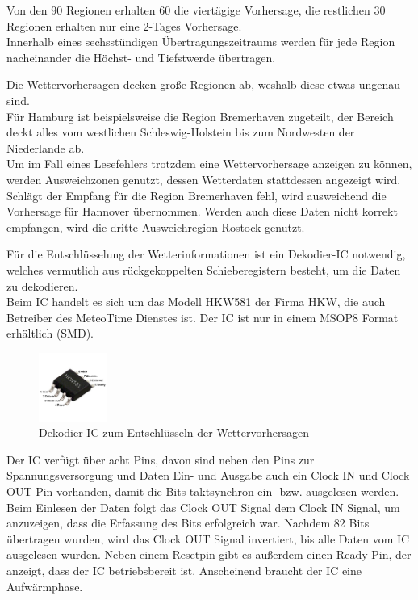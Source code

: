 \documentclass[a4paper,11pt]{article}
\begin{document}
\vspace{0.2cm}
\noindent
Von den 90 Regionen erhalten 60 die viertägige Vorhersage, die restlichen 30 Regionen erhalten nur eine 2-Tages Vorhersage. \\
Innerhalb eines sechsstündigen Übertragungszeitraums werden für jede Region nacheinander die Höchst- und Tiefstwerde übertragen.

\noindent
Die Wettervorhersagen decken große Regionen ab, weshalb diese etwas ungenau sind. \\
Für Hamburg ist beispielsweise die Region Bremerhaven zugeteilt, der Bereich deckt alles vom westlichen Schleswig-Holstein bis zum Nordwesten der Niederlande ab. \\
Um im Fall eines Lesefehlers trotzdem eine Wettervorhersage anzeigen zu können, werden Ausweichzonen genutzt, dessen Wetterdaten stattdessen angezeigt wird. Schlägt
der Empfang für die Region Bremerhaven fehl, wird ausweichend die Vorhersage für Hannover übernommen. Werden auch diese Daten nicht korrekt empfangen, wird die dritte
Ausweichregion Rostock genutzt. 

\vspace{0.3cm}
\noindent
Für die Entschlüsselung der Wetterinformationen ist ein Dekodier-IC notwendig, welches vermutlich aus rückgekoppelten Schieberegistern besteht, um die Daten zu dekodieren. \\
Beim IC handelt es sich um das Modell HKW581 der Firma HKW, die auch Betreiber des MeteoTime Dienstes ist. Der IC ist nur in einem MSOP8 Format erhältlich (SMD).

\begin{figure}[H]
  \centering
  \includegraphics[width = 0.2\textwidth]{HKW5811}
  \caption{Dekodier-IC zum Entschlüsseln der Wettervorhersagen}
  \label{fig:hkw581}
\end{figure}

\noindent
Der IC verfügt über acht Pins, davon sind neben den Pins zur Spannungsversorgung und Daten Ein- und Ausgabe auch ein Clock IN und Clock OUT Pin vorhanden, damit die Bits
taktsynchron ein- bzw. ausgelesen werden. Beim Einlesen der Daten folgt das Clock OUT Signal dem Clock IN Signal, um anzuzeigen, dass die Erfassung des Bits erfolgreich war. 
Nachdem 82 Bits übertragen wurden, wird das Clock OUT Signal invertiert, bis alle Daten vom IC ausgelesen wurden. 
Neben einem Resetpin gibt es außerdem einen Ready Pin, der anzeigt, dass der IC betriebsbereit ist. Anscheinend braucht der IC eine Aufwärmphase. 
\end{document}
